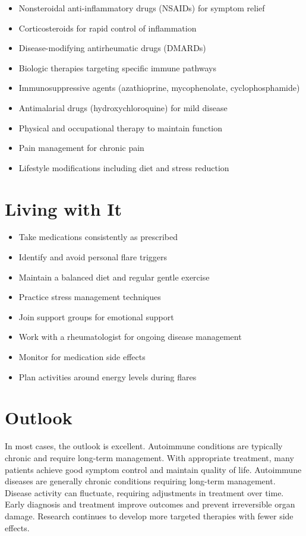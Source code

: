 \begin{itemize}[noitemsep]
  \item Nonsteroidal anti-inflammatory drugs (NSAIDs) for symptom relief
  \item Corticosteroids for rapid control of inflammation
  \item Disease-modifying antirheumatic drugs (DMARDs)
  \item Biologic therapies targeting specific immune pathways
  \item Immunosuppressive agents (azathioprine, mycophenolate, cyclophosphamide)
  \item Antimalarial drugs (hydroxychloroquine) for mild disease
  \item Physical and occupational therapy to maintain function
  \item Pain management for chronic pain
  \item Lifestyle modifications including diet and stress reduction
\end{itemize}
\section{Living with It}
\begin{itemize}[noitemsep]
  \item Take medications consistently as prescribed
  \item Identify and avoid personal flare triggers
  \item Maintain a balanced diet and regular gentle exercise
  \item Practice stress management techniques
  \item Join support groups for emotional support
  \item Work with a rheumatologist for ongoing disease management
  \item Monitor for medication side effects
  \item Plan activities around energy levels during flares
\end{itemize}
\section{Outlook}
In most cases, the outlook is excellent. Autoimmune conditions are typically chronic and require long-term management. With appropriate treatment, many patients achieve good symptom control and maintain quality of life. Autoimmune diseases are generally chronic conditions requiring long-term management. Disease activity can fluctuate, requiring adjustments in treatment over time. Early diagnosis and treatment improve outcomes and prevent irreversible organ damage. Research continues to develop more targeted therapies with fewer side effects.
